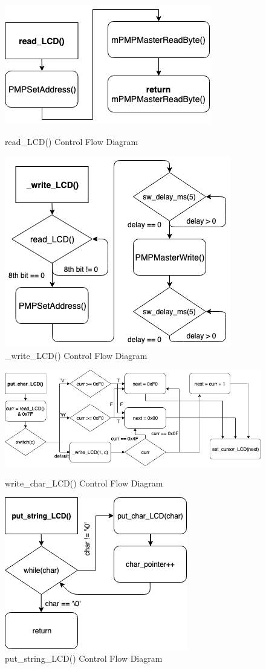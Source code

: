 \documentclass[a4paper, 12pt]{article}
\begin{document}
\begin{figure}[htb]
\centering
\includegraphics[width=.6\textwidth]{read_LCD_CFD.png}
\caption{read\_LCD() Control Flow Diagram}
\includegraphics[width=.6\textwidth]{_write_LCD_CFD.png}
\caption{\_write\_LCD() Control Flow Diagram}
\end{figure}

\begin{figure}[htb]
\centering
\includegraphics[width=.8\textwidth]{write_char_LCD_CFD.png}
\caption{write\_char\_LCD() Control Flow Diagram}
\includegraphics[width=.4\textwidth]{put_string_LCD_CFD.png}
\caption{put\_string\_LCD() Control Flow Diagram}
\end{figure}
\end{document}
